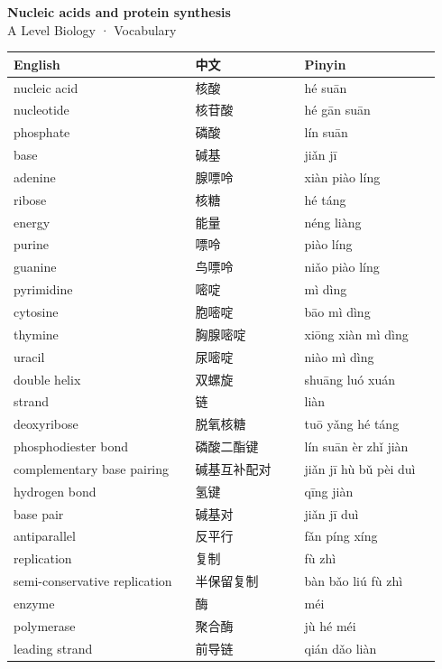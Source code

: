 \documentclass[11pt]{article}
\begin{document}
\begin{center}
  {\LARGE\bfseries Nucleic acids and protein synthesis}\\[0.35em]
  {\large A Level Biology · Vocabulary}
\end{center}
\vspace{0.6em}

\begin{longtable}{@{}p{0.40\linewidth}p{0.24\linewidth}p{0.30\linewidth}@{}}
\toprule
\textbf{English} & \textbf{中文} & \textbf{Pinyin} \\
\midrule
\endhead
\bottomrule
\endlastfoot
nucleic acid & 核酸 & hé suān \\
nucleotide & 核苷酸 & hé gān suān \\
phosphate & 磷酸 & lín suān \\
base & 碱基 & jiǎn jī \\
adenine & 腺嘌呤 & xiàn piào líng \\
ribose & 核糖 & hé táng \\
energy & 能量 & néng liàng \\
purine & 嘌呤 & piào líng \\
guanine & 鸟嘌呤 & niǎo piào líng \\
pyrimidine & 嘧啶 & mì dìng \\
cytosine & 胞嘧啶 & bāo mì dìng \\
thymine & 胸腺嘧啶 & xiōng xiàn mì dìng \\
uracil & 尿嘧啶 & niào mì dìng \\
double helix & 双螺旋 & shuāng luó xuán \\
strand & 链 & liàn \\
deoxyribose & 脱氧核糖 & tuō yǎng hé táng \\
phosphodiester bond & 磷酸二酯键 & lín suān èr zhǐ jiàn \\
complementary base pairing & 碱基互补配对 & jiǎn jī hù bǔ pèi duì \\
hydrogen bond & 氢键 & qīng jiàn \\
base pair & 碱基对 & jiǎn jī duì \\
antiparallel & 反平行 & fǎn píng xíng \\
replication & 复制 & fù zhì \\
semi-conservative replication & 半保留复制 & bàn bǎo liú fù zhì \\
enzyme & 酶 & méi \\
polymerase & 聚合酶 & jù hé méi \\
leading strand & 前导链 & qián dǎo liàn \\

\end{longtable}
\end{document}
